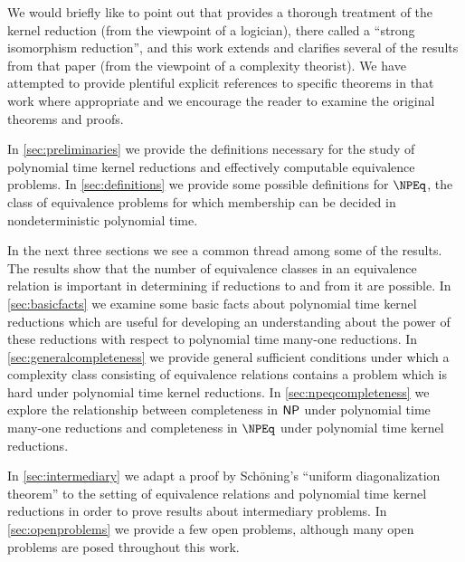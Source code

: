 We would briefly like to point out that \cite{bcffm} provides a thorough treatment of the kernel reduction (from the viewpoint of a logician), there called a ``strong isomorphism reduction'', and this work extends and clarifies several of the results from that paper (from the viewpoint of a complexity theorist).
We have attempted to provide plentiful explicit references to specific theorems in that work where appropriate and we encourage the reader to examine the original theorems and proofs.

In \autoref{sec:preliminaries} we provide the definitions necessary for the study of polynomial time kernel reductions and effectively computable equivalence problems.
In \autoref{sec:definitions} we provide some possible definitions for $\NPEq$, the class of equivalence problems for which membership can be decided in nondeterministic polynomial time.

In the next three sections we see a common thread among some of the results.
The results show that the number of equivalence classes in an equivalence relation is important in determining if reductions to and from it are possible.
In \autoref{sec:basicfacts} we examine some basic facts about polynomial time kernel reductions which are useful for developing an understanding about the power of these reductions with respect to polynomial time many-one reductions.
In \autoref{sec:generalcompleteness} we provide general sufficient conditions under which a complexity class consisting of equivalence relations contains a problem which is hard under polynomial time kernel reductions.
In \autoref{sec:npeqcompleteness} we explore the relationship between completeness in ${\mathsf{NP}}$ under polynomial time many-one reductions and completeness in $\NPEq$ under polynomial time kernel reductions.

In \autoref{sec:intermediary} we adapt a proof by Sch\"{o}ning's ``uniform diagonalization theorem'' to the setting of equivalence relations and polynomial time kernel reductions in order to prove results about intermediary problems.
In \autoref{sec:openproblems} we provide a few open problems, although many open problems are posed throughout this work.
